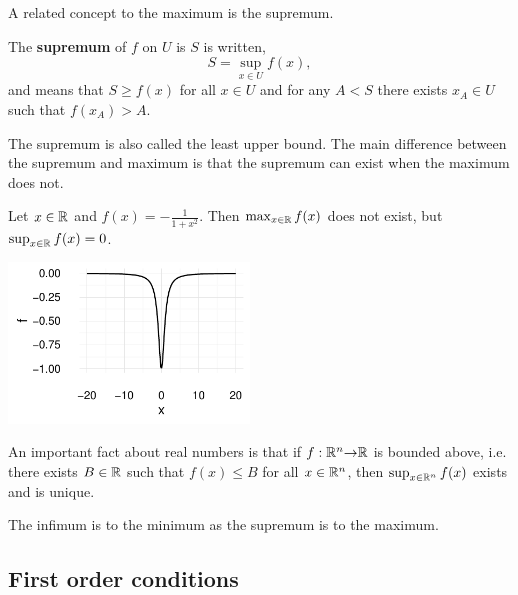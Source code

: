 A related concept to the maximum is the supremum.
\begin{definition}
  The \textbf{supremum} of $f$ on $U$ is $S$ is written, 
  \[ S = \sup_{x \in U} f(x), \]
  and means that $S \geq f(x)$ for all $x \in U$ and for any $A < S$
  there exists $x_A \in U$ such that $f(x_A) > A$. 
\end{definition}
The supremum is also called the least upper bound. The main difference
between the supremum and maximum is that the supremum can exist when
the maximum does not. 
\begin{example}
  \begin{multicols}{2}
    Let $x \in \mathbb{R}$ and $f(x) = -\frac{1}{1+x^2}$. Then $\max_{x \in \mathbb{R}}
    f(x)$ does not exist, but $\sup_{x \in \mathbb{R}} f(x) = 0$. 
    
    \columnbreak
    
    \includegraphics[width=0.48\textwidth]{ex12}

  \end{multicols}
  
\end{example}
An important fact about real numbers is that if $f:\mathbb{R}^n {\rightarrow} \mathbb{R}$ is
bounded above, i.e. there exists $B \in \mathbb{R}$ such that $f(x) \leq B$
for all $x \in \mathbb{R}^n$, then $\sup_{x \in \mathbb{R}^n} f(x)$ exists and is
unique. 

The infimum is to the minimum as the supremum is to the maximum.

\subsection{First order conditions}

